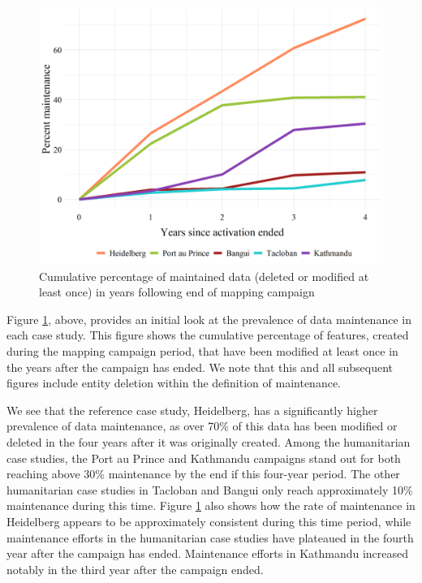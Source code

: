 \begin{figure} %
    \centering %
    \includegraphics[width = \textwidth]{Images/totmaint.png} %
    \caption[Percent of total maintained data over time.]{Cumulative percentage of maintained data (deleted or modified at least once) in years following end of mapping campaign} %
    \label{fig:tot} %
\end{figure}

Figure \ref{fig:tot}, above, provides an initial look at the prevalence of data maintenance in each case study. This figure shows the cumulative percentage of features, created during the mapping campaign period, that have been modified at least once in the years after the campaign has ended. We note that this and all subsequent figures include entity deletion within the definition of maintenance. 

We see that the reference case study, Heidelberg, has a significantly higher prevalence of data maintenance, as over 70\% of this data has been modified or deleted in the four years after it was originally created. Among the humanitarian case studies, the Port au Prince and Kathmandu campaigns stand out for both reaching above 30\% maintenance by the end if this four-year period. The other humanitarian case studies in Tacloban and Bangui only reach approximately 10\% maintenance during this time. Figure \ref{fig:tot} also shows how the rate of maintenance in Heidelberg appears to be approximately consistent during this time period, while maintenance efforts in the humanitarian case studies have plateaued in the fourth year after the campaign has ended. Maintenance efforts in Kathmandu increased notably in the third year after the campaign ended.


